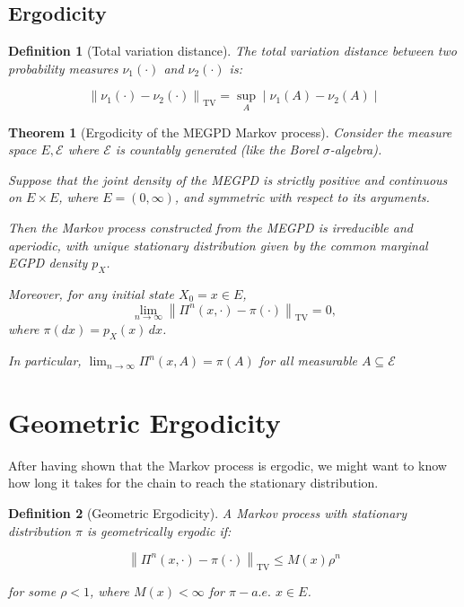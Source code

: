 \documentclass{article}
\newtheorem{definition}{Definition}[section]
\newtheorem{theorem}[theorem]{Theorem}
\begin{document}
\subsection{Ergodicity}

\begin{definition}[Total variation distance]
  The total variation distance between two probability measures $\nu_1(\cdot)$ and $\nu_2(\cdot)$ is:

  \[
    \left\| \nu_1(\cdot) - \nu_2(\cdot) \right\|_{\mathrm{TV}} = \sup_A \mid \nu_1(A) - \nu_2(A) \mid
  \]
\end{definition}

\begin{theorem}[Ergodicity of the MEGPD Markov process]
  \label{thm:megpd-ergodicity}
  Consider the measure space $E, \mathcal{E}$ where $\mathcal{E}$ is countably generated (like the Borel $\sigma$-algebra).

  Suppose that the joint density of the MEGPD is strictly positive and continuous on $E\times E$, where $E=(0,\infty)$, and symmetric with respect to its arguments.

  Then the Markov process constructed from the MEGPD is irreducible and aperiodic, with unique stationary distribution given by the common marginal EGPD density $p_X$.

  Moreover, for any initial state $X_0=x\in E$,
  \[
    \lim_{n\to\infty}
    \left\|\Pi^n(x,\cdot)-\pi(\cdot)\right\|_{\mathrm{TV}}
    =0,
  \]
  where $\pi(dx)=p_X(x)\,dx$.

  In particular, $\lim_{n \to \infty} \Pi^n(x, A) = \pi(A)$ for all measurable $A \subseteq \mathcal{E}$
\end{theorem}

\section{Geometric Ergodicity}
After having shown that the Markov process is ergodic, we might want to know how long it takes for the chain to reach the stationary distribution.

\begin{definition}[Geometric Ergodicity]
  A Markov process with stationary distribution $\pi$ is geometrically ergodic if:

  \[
  \left\| \Pi^n(x, \cdot) - \pi(\cdot) \right\|_{\mathrm{TV}} \leq M(x) \rho^n
  \]

  for some $\rho < 1$, where $M(x) < \infty$ for $\pi-a.e.$ $x \in E$. 
\end{definition}
\end{document}
